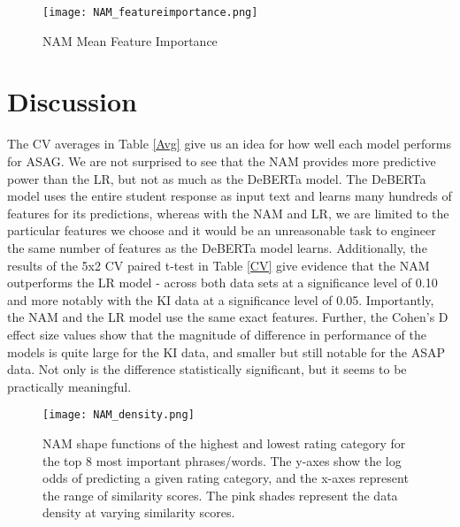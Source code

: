 \begin{figure}
  \texttt{[image: NAM\_featureimportance.png]}
  \caption{NAM Mean Feature Importance}
  \label{featImportance}
\end{figure}
 
\section{Discussion}
The CV averages in Table \ref{Avg} give us an idea for how well each model performs for ASAG. We are not surprised to see that the NAM provides more predictive power than the LR, but not as much as the DeBERTa model. The DeBERTa model uses the entire student response as input text and learns many hundreds of features for its predictions, whereas with the NAM and LR, we are limited to the particular features we choose and it would be an unreasonable task to engineer the same number of features as the DeBERTa model learns. Additionally, the results of the 5x2 CV paired t-test in Table \ref{CV} give evidence that the NAM outperforms the LR model - across both data sets at a significance level of 0.10 and more notably with the KI data at a significance level of 0.05. Importantly, the NAM and the LR model use the same exact features. Further, the Cohen's D effect size values show that the magnitude of difference in performance of the models is quite large for the KI data, and smaller but still notable for the ASAP data. Not only is the difference statistically significant, but it seems to be practically meaningful. 

\begin{figure}
  \texttt{[image: NAM\_density.png]}
  \caption{NAM shape functions of the highest and lowest rating category for the top 8 most important phrases/words. The y-axes show the log odds of predicting a given rating category, and the x-axes represent the range of similarity scores. The pink shades represent the data density at varying similarity scores.}
  \label{density}
\end{figure}

